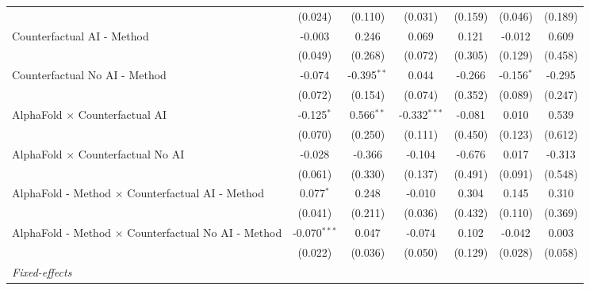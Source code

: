 \begin{tabular}{lcccccc}
                                                              & (0.024)        & (0.110)       & (0.031)        & (0.159)      & (0.046)      & (0.189)\\   
   Counterfactual AI - Method                                 & -0.003         & 0.246         & 0.069          & 0.121        & -0.012       & 0.609\\   
                                                              & (0.049)        & (0.268)       & (0.072)        & (0.305)      & (0.129)      & (0.458)\\   
   Counterfactual No AI - Method                              & -0.074         & -0.395$^{**}$ & 0.044          & -0.266       & -0.156$^{*}$ & -0.295\\   
                                                              & (0.072)        & (0.154)       & (0.074)        & (0.352)      & (0.089)      & (0.247)\\   
   AlphaFold $\times$ Counterfactual AI                       & -0.125$^{*}$   & 0.566$^{**}$  & -0.332$^{***}$ & -0.081       & 0.010        & 0.539\\   
                                                              & (0.070)        & (0.250)       & (0.111)        & (0.450)      & (0.123)      & (0.612)\\   
   AlphaFold $\times$ Counterfactual No AI                    & -0.028         & -0.366        & -0.104         & -0.676       & 0.017        & -0.313\\   
                                                              & (0.061)        & (0.330)       & (0.137)        & (0.491)      & (0.091)      & (0.548)\\   
   AlphaFold - Method $\times$ Counterfactual AI - Method     & 0.077$^{*}$    & 0.248         & -0.010         & 0.304        & 0.145        & 0.310\\   
                                                              & (0.041)        & (0.211)       & (0.036)        & (0.432)      & (0.110)      & (0.369)\\   
   AlphaFold - Method $\times$ Counterfactual No AI - Method  & -0.070$^{***}$ & 0.047         & -0.074         & 0.102        & -0.042       & 0.003\\   
                                                              & (0.022)        & (0.036)       & (0.050)        & (0.129)      & (0.028)      & (0.058)\\   
   \midrule
   \emph{Fixed-effects}\\

\end{tabular}
